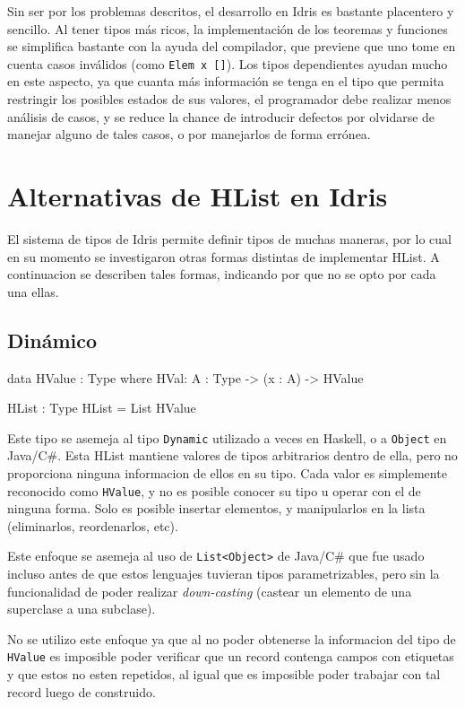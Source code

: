 Sin ser por los problemas descritos, el desarrollo en Idris es bastante placentero y sencillo. Al tener tipos más ricos, la implementación de los teoremas y funciones se simplifica bastante con la ayuda del compilador, que previene que uno tome en cuenta casos inválidos (como \texttt{Elem x []}). Los tipos dependientes ayudan mucho en este aspecto, ya que cuanta más información se tenga en el tipo que permita restringir los posibles estados de sus valores, el programador debe realizar menos análisis de casos, y se reduce la chance de introducir defectos por olvidarse de manejar alguno de tales casos, o por manejarlos de forma errónea.

\section{Alternativas de HList en Idris}

El sistema de tipos de Idris permite definir tipos de muchas maneras, por lo cual en su momento se investigaron otras formas distintas de implementar HList.
A continuacion se describen tales formas, indicando por que no se opto por cada una ellas.

\subsection{Dinámico}

\begin{code}
data HValue : Type where
    HVal: {A : Type} -> (x : A) -> HValue

HList : Type
HList = List HValue 
\end{code}

Este tipo se asemeja al tipo \texttt{Dynamic} utilizado a veces en Haskell, o a \texttt{Object} en Java/C\#. Esta HList mantiene valores de tipos arbitrarios dentro de ella, pero no proporciona ninguna informacion de ellos en su tipo. Cada valor es simplemente reconocido como \texttt{HValue}, y no es posible conocer su tipo u operar con el de ninguna forma. Solo es posible insertar elementos, y manipularlos en la lista (eliminarlos, reordenarlos, etc).

Este enfoque se asemeja al uso de \texttt{List<Object>} de Java/C\# que fue usado incluso antes de que estos lenguajes tuvieran tipos parametrizables, pero sin la funcionalidad de poder realizar \textit{down-casting} (castear un elemento de una superclase a una subclase).

No se utilizo este enfoque ya que al no poder obtenerse la informacion del tipo de \texttt{HValue} es imposible poder verificar que un record contenga campos con etiquetas y que estos no esten repetidos, al igual que es imposible poder trabajar con tal record luego de construido.

